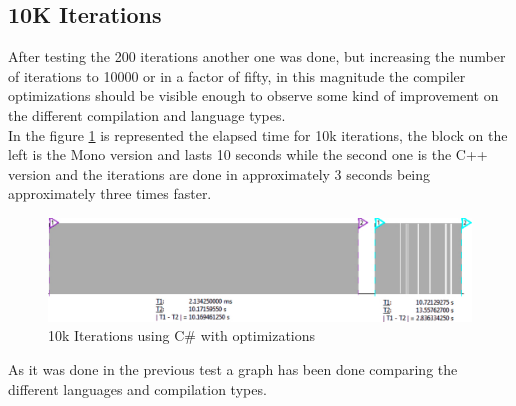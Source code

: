 \subsection{10K Iterations}\label{SS:10K-iterations}
After testing the 200 iterations another one was done, but increasing the number of iterations to 10000 or in a factor of fifty, in this magnitude the compiler optimizations should be visible enough to observe some kind of improvement on the different compilation and language types.
\\
In the figure \ref{fig:gpio-10kit-csharp+cpp} is represented the elapsed time for 10k iterations, the block on the left is the Mono version and lasts 10 seconds while the second one is the C++ version and the iterations are done in approximately 3 seconds being approximately three times faster.
\begin{figure}[H]\begin{center}
 \centering
  \captionsetup{justification=centering}
  \includegraphics[width=1\textwidth]{pictures/performance-tests/GPIO/10k/cxx+csharp}
  \caption{10k Iterations using C\# with optimizations \label{fig:gpio-10kit-csharp+cpp}}
\end{center}\end{figure}
As it was done in the previous test a graph has been done comparing the different languages and compilation types.
